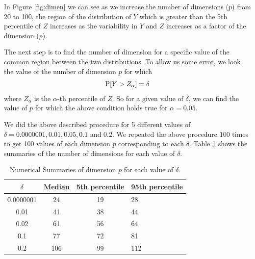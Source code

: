 \documentclass[12]{article}
\begin{document}
In Figure \ref{fig:dimen} we can see as we increase the number of dimensions ($p$) from 20 to 100, the region of the distribution of $Y$ which is greater than the 5th percentile of $Z$ increases as the variability in $Y$ and $Z$ increases as a factor of the dimension ($p$).


The next step is to find the number of dimension for a specific value of the common region between the two distributions. To allow us some error, we look the value of the number of dimension $p$ for which $$\hbox{P}[Y > Z_{\alpha}] = \delta$$ where $Z_{\alpha}$ is the $\alpha$-th percentile of $Z$.  So for a given value of $\delta$, we can find the value of $p$ for which the above condition holds true for $\alpha = 0.05$.

We did the above described procedure for 5 different values of $\delta  = 0.0000001, 0.01, 0.05, 0.1$ and $0.2$. We repeated the above procedure 100 times to get 100 values of each dimension $p$ corresponding to each $\delta$. Table \ref{tab:dimen} shows the summaries of the number of dimensions for each value of $\delta$.

\begin{table}[htbp]
\begin{center}
\caption{Numerical Summaries of dimension $p$ for each value of $\delta$.}
\begin{tabular}{cccp{3cm}}
  \hline
  \hline
  $\delta$ & Median & 5th percentile & 95th percentile \\
  \hline
  0.0000001 & 24 & 19 & 28 \\
      0.01 & 41 & 38 & 44\\
   0.02 & 61 & 56 & 64 \\
     0.1 & 77 & 72 & 81\\   
     0.2 & 106 & 99 & 112\\ 
      \hline
\end{tabular}
\label{tab:dimen}
\end{center}
\end{table}

\end{document}
